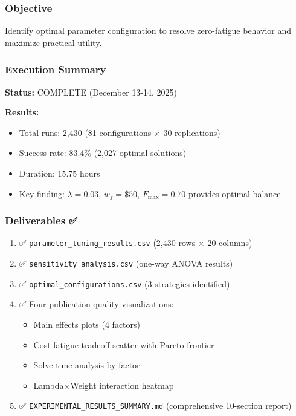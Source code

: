 \documentclass[11pt,letterpaper]{article}
\begin{document}
\subsubsection{Objective}
Identify optimal parameter configuration to resolve zero-fatigue behavior and maximize practical utility.

\subsubsection{Execution Summary}
\textbf{Status:} COMPLETE (December 13-14, 2025)

\textbf{Results:}
\begin{itemize}[leftmargin=*]
    \item Total runs: 2,430 (81 configurations $\times$ 30 replications)
    \item Success rate: 83.4\% (2,027 optimal solutions)
    \item Duration: 15.75 hours
    \item Key finding: $\lambda=0.03$, $w_f=\$50$, $F_{\max}=0.70$ provides optimal balance
\end{itemize}

\subsubsection{Deliverables ✅}
\begin{enumerate}[leftmargin=*]
    \item ✅ \texttt{parameter\_tuning\_results.csv} (2,430 rows $\times$ 20 columns)
    \item ✅ \texttt{sensitivity\_analysis.csv} (one-way ANOVA results)
    \item ✅ \texttt{optimal\_configurations.csv} (3 strategies identified)
    \item ✅ Four publication-quality visualizations:
    \begin{itemize}[leftmargin=*]
        \item Main effects plots (4 factors)
        \item Cost-fatigue tradeoff scatter with Pareto frontier
        \item Solve time analysis by factor
        \item Lambda×Weight interaction heatmap
    \end{itemize}
    \item ✅ \texttt{EXPERIMENTAL\_RESULTS\_SUMMARY.md} (comprehensive 10-section report)
\end{enumerate}
\end{document}
